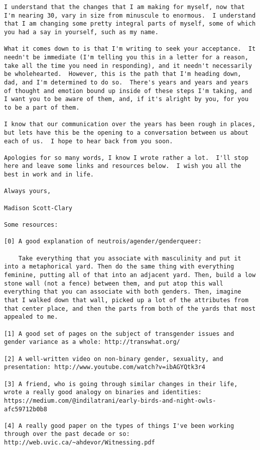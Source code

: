 \begin{verbatim}
I understand that the changes that I am making for myself, now that I'm nearing 30, vary in size from minuscule to enormous.  I understand that I am changing some pretty integral parts of myself, some of which you had a say in yourself, such as my name.

What it comes down to is that I'm writing to seek your acceptance.  It needn't be immediate (I'm telling you this in a letter for a reason, take all the time you need in responding), and it needn't necessarily be wholehearted.  However, this is the path that I'm heading down, dad, and I'm determined to do so.  There's years and years and years of thought and emotion bound up inside of these steps I'm taking, and I want you to be aware of them, and, if it's alright by you, for you to be a part of them.

I know that our communication over the years has been rough in places, but lets have this be the opening to a conversation between us about each of us.  I hope to hear back from you soon.

Apologies for so many words, I know I wrote rather a lot.  I'll stop here and leave some links and resources below.  I wish you all the best in work and in life.

Always yours,

Madison Scott-Clary

Some resources:

[0] A good explanation of neutrois/agender/genderqueer:

    Take everything that you associate with masculinity and put it into a metaphorical yard. Then do the same thing with everything feminine, putting all of that into an adjacent yard. Then, build a low stone wall (not a fence) between them, and put atop this wall everything that you can associate with both genders. Then, imagine that I walked down that wall, picked up a lot of the attributes from that center place, and then the parts from both of the yards that most appealed to me.

[1] A good set of pages on the subject of transgender issues and gender variance as a whole: http://transwhat.org/

[2] A well-written video on non-binary gender, sexuality, and presentation: http://www.youtube.com/watch?v=ibAGYQtk3r4

[3] A friend, who is going through similar changes in their life, wrote a really good analogy on binaries and identities: https://medium.com/@indilatrani/early-birds-and-night-owls-afc59712b0b8

[4] A really good paper on the types of things I've been working through over the past decade or so: http://web.uvic.ca/~ahdevor/Witnessing.pdf
\end{verbatim}

